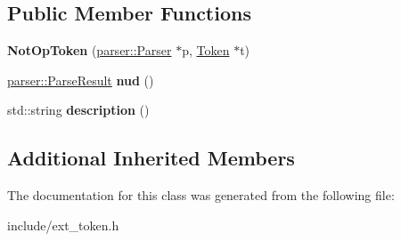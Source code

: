 \subsection*{Public Member Functions}
\begin{DoxyCompactItemize}
\item 
{\bfseries Not\+Op\+Token} (\hyperlink{classfcal_1_1parser_1_1Parser}{parser\+::\+Parser} $\ast$p, \hyperlink{classfcal_1_1scanner_1_1Token}{Token} $\ast$t)\hypertarget{classfcal_1_1scanner_1_1NotOpToken_addec5b73aa06a1b13a870f9c620614c0}{}\label{classfcal_1_1scanner_1_1NotOpToken_addec5b73aa06a1b13a870f9c620614c0}

\item 
\hyperlink{classfcal_1_1parser_1_1ParseResult}{parser\+::\+Parse\+Result} {\bfseries nud} ()\hypertarget{classfcal_1_1scanner_1_1NotOpToken_a4fe82b09660e6f180319786cbe0428bc}{}\label{classfcal_1_1scanner_1_1NotOpToken_a4fe82b09660e6f180319786cbe0428bc}

\item 
std\+::string {\bfseries description} ()\hypertarget{classfcal_1_1scanner_1_1NotOpToken_ae56a9526025d994262cf83879e0c2533}{}\label{classfcal_1_1scanner_1_1NotOpToken_ae56a9526025d994262cf83879e0c2533}

\end{DoxyCompactItemize}
\subsection*{Additional Inherited Members}


The documentation for this class was generated from the following file\+:\begin{DoxyCompactItemize}
\item 
include/ext\+\_\+token.\+h\end{DoxyCompactItemize}
